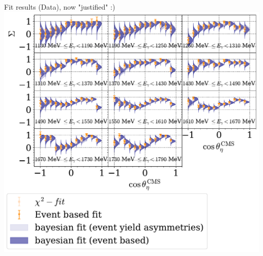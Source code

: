 \documentclass[11pt,aspectratio=169,dvipsnames]{beamer}
\begin{document}
\begin{frame}{Fit results (Data), now "justified" :)}
	\centering
		\includegraphics[width=.6\linewidth]{../../bayes/event_based_fit/plots/sigma_eta_alt.pdf}
\end{frame}
	
	
	
	
	
\end{document}
